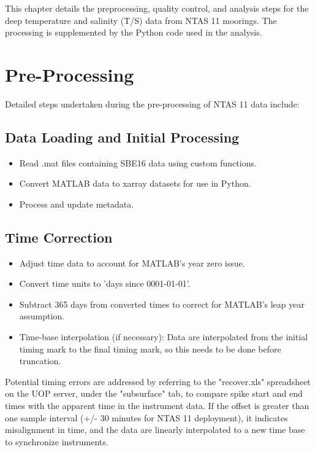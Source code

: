 \documentclass[11pt]{article}
\newcommand{\projectname}{NTAS}  %
\newcommand{\casenumber}{11}  %
\newcommand{\FirstInstrumentType}{SBE16}  %
\begin{document}
This chapter details the preprocessing, quality control, 
and analysis steps for the deep temperature and salinity (T/S) data from \projectname{} \casenumber{} moorings.
The processing is supplemented by the Python code used in the analysis.

\section{Pre-Processing}
Detailed steps undertaken during the pre-processing of \projectname{} \casenumber{} data include:

\subsection{Data Loading and Initial Processing}
\begin{itemize}
\item Read .mat files containing \FirstInstrumentType{} data using custom functions.
\item Convert MATLAB data to xarray datasets for use in Python.
\item Process and update metadata.
\end{itemize}

\subsection{Time Correction}
\begin{itemize}
\item Adjust time data to account for MATLAB's year zero issue.
\item Convert time units to 'days since 0001-01-01'.
\item Subtract 365 days from converted times to correct for MATLAB's leap year assumption.
\item Time-base interpolation (if necessary): Data are interpolated from the initial timing mark to the final timing mark, 
so this needs to be done before truncation.
\end{itemize}

Potential timing errors are addressed by referring to the "recover.xls" spreadsheet on the UOP server, 
under the "subsurface" tab, to compare spike start and end times with the apparent time in the instrument data. 
If the offset is greater than one sample interval (+/- 30 minutes for NTAS 11 deployment), 
it indicates misalignment in time, and the data are linearly interpolated to a new time base to synchronize instruments.
\end{document}
